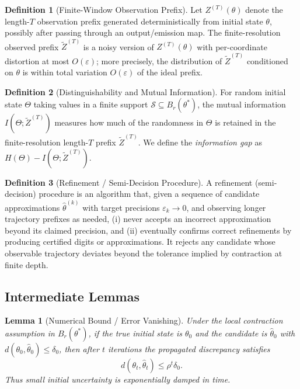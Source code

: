 \documentclass[12pt]{article}
\theoremstyle{definition}
\newtheorem{definition}{Definition}[section]
\theoremstyle{plain}
\newtheorem{lemma}{Lemma}[section]
\begin{document}
\begin{definition}[Finite-Window Observation Prefix]
Let \(Z^{(T)}(\theta)\) denote the length-\(T\) observation prefix generated deterministically from initial state \(\theta\), possibly after passing through an output/emission map. The finite-resolution observed prefix \(\widetilde Z^{(T)}\) is a noisy version of \(Z^{(T)}(\theta)\) with per-coordinate distortion at most \(O(\varepsilon)\); more precisely, the distribution of \(\widetilde Z^{(T)}\) conditioned on \(\theta\) is within total variation \(O(\varepsilon)\) of the ideal prefix.
\end{definition}

\begin{definition}[Distinguishability and Mutual Information]
For random initial state \(\Theta\) taking values in a finite support \(\mathcal{S}\subseteq B_r(\theta^*)\), the mutual information \(I(\Theta;\widetilde Z^{(T)})\) measures how much of the randomness in \(\Theta\) is retained in the finite-resolution length-\(T\) prefix \(\widetilde Z^{(T)}\). We define the \emph{information gap} as \(H(\Theta)-I(\Theta;\widetilde Z^{(T)})\).
\end{definition}

\begin{definition}[Refinement / Semi-Decision Procedure]
A refinement (semi-decision) procedure is an algorithm that, given a sequence of candidate approximations \(\widehat\theta^{(k)}\) with target precisions \(\varepsilon_k\to 0\), and observing longer trajectory prefixes as needed, (i) never accepts an incorrect approximation beyond its claimed precision, and (ii) eventually confirms correct refinements by producing certified digits or approximations. It rejects any candidate whose observable trajectory deviates beyond the tolerance implied by contraction at finite depth.
\end{definition}

\subsection{Intermediate Lemmas}

\begin{lemma}[Numerical Bound / Error Vanishing]\label{lem:numerical-vanishing}
Under the local contraction assumption in \(B_r(\theta^*)\), if the true initial state is \(\theta_0\) and the candidate is \(\widehat\theta_0\) with \(d(\theta_0,\widehat\theta_0)\le \delta_0\), then after \(t\) iterations the propagated discrepancy satisfies
\[
d(\theta_t,\widehat\theta_t)\le \rho^t \delta_0.
\]
Thus small initial uncertainty is exponentially damped in time.
\end{lemma}
\end{document}
